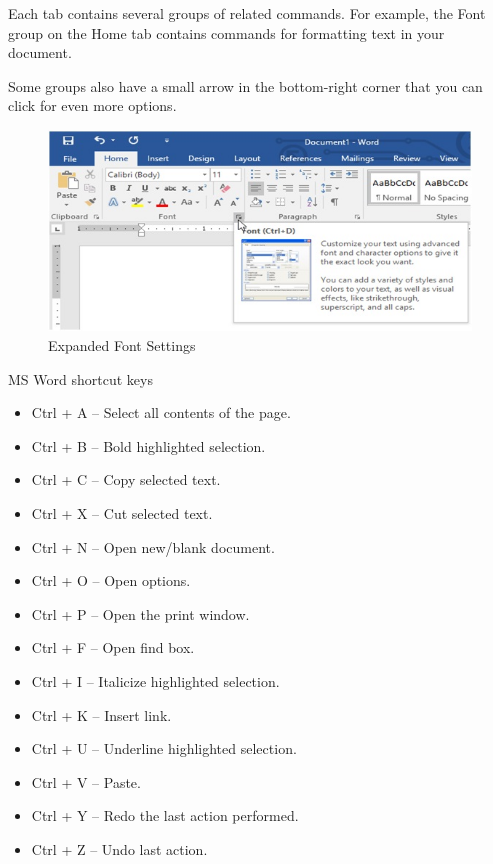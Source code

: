 \documentclass[11pt,a4paper,twoside]{article}
\begin{document}
Each tab contains several groups of related commands. For example, the Font group on the Home tab contains commands for formatting text in your document.\par
Some groups also have a small arrow in the bottom-right corner that you can click for even more options.
\begin{figure}[H]
\includegraphics[width=1\textwidth]{Fig 26.jpg}
\caption{Expanded Font Settings}
\end{figure} 

MS Word shortcut keys
\begin{itemize}
\item Ctrl + A -- Select all contents of the page.
\item Ctrl + B -- Bold highlighted selection.
\item Ctrl + C -- Copy selected text.
\item Ctrl + X -- Cut selected text.
\item Ctrl + N -- Open new/blank document.
\item Ctrl + O -- Open options.
\item Ctrl + P -- Open the print window.
\item Ctrl + F -- Open find box.
\item Ctrl + I -- Italicize highlighted selection.
\item Ctrl + K -- Insert link.
\item Ctrl + U -- Underline highlighted selection.
\item Ctrl + V -- Paste.
\item Ctrl + Y -- Redo the last action performed.
\item Ctrl + Z -- Undo last action.
\end{itemize}
	
\end{document}
